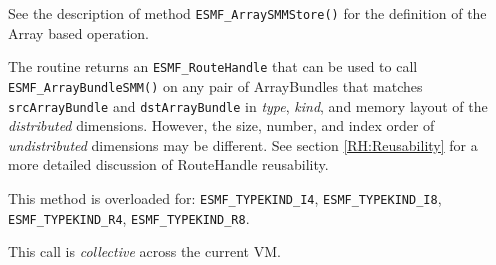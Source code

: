      See the description of method {\tt ESMF\_ArraySMMStore()} for
     the definition of the Array based operation.
  
     The routine returns an {\tt ESMF\_RouteHandle} that can be used to call 
     {\tt ESMF\_ArrayBundleSMM()} on any pair of ArrayBundles that matches 
     {\tt srcArrayBundle} and {\tt dstArrayBundle} in {\em type}, {\em kind},
     and memory layout of the {\em distributed} dimensions. However, the size, 
     number, and index order of {\em undistributed} dimensions may be different.
     See section \ref{RH:Reusability} for a more detailed discussion of
     RouteHandle reusability.
    
     This method is overloaded for:\newline
     {\tt ESMF\_TYPEKIND\_I4}, {\tt ESMF\_TYPEKIND\_I8},\newline 
     {\tt ESMF\_TYPEKIND\_R4}, {\tt ESMF\_TYPEKIND\_R8}.
     \newline
  
     This call is {\em collective} across the current VM.
  
